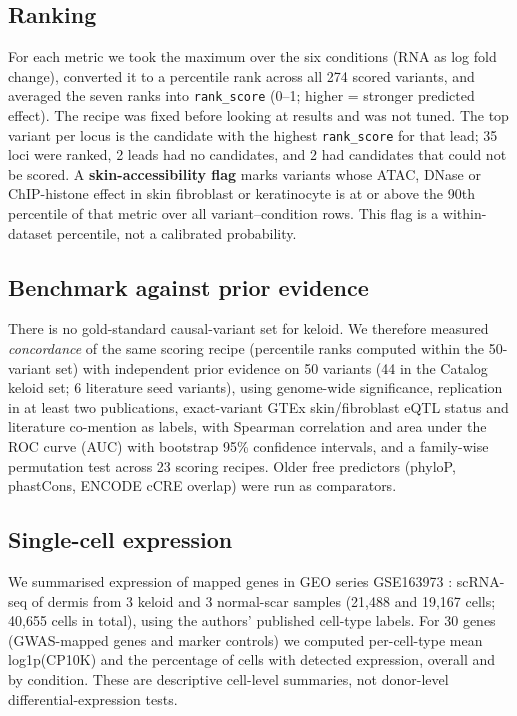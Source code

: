 \documentclass[10pt,twocolumn,a4paper]{article}
\begin{document}
\subsection{Ranking}

For each metric we took the maximum over the six conditions (RNA as \textbar log fold change\textbar), converted it to a percentile rank across all 274 scored variants, and averaged the seven ranks into \texttt{rank\_score} (0--1; higher = stronger predicted effect). The recipe was fixed before looking at results and was not tuned. The top variant per locus is the candidate with the highest \texttt{rank\_score} for that lead; 35 loci were ranked, 2 leads had no candidates, and 2 had candidates that could not be scored. A \textbf{skin-accessibility flag} marks variants whose ATAC, DNase or ChIP-histone effect in skin fibroblast or keratinocyte is at or above the 90th percentile of that metric over all variant--condition rows. This flag is a within-dataset percentile, not a calibrated probability.

\subsection{Benchmark against prior evidence}

There is no gold-standard causal-variant set for keloid. We therefore measured \emph{concordance} of the same scoring recipe (percentile ranks computed within the 50-variant set) with independent prior evidence on 50 variants (44 in the Catalog keloid set; 6 literature seed variants), using genome-wide significance, replication in at least two publications, exact-variant GTEx skin/fibroblast eQTL status and literature co-mention as labels, with Spearman correlation and area under the ROC curve (AUC) with bootstrap 95\% confidence intervals, and a family-wise permutation test across 23 scoring recipes. Older free predictors (phyloP, phastCons, ENCODE cCRE overlap) were run as comparators.

\subsection{Single-cell expression}

We summarised expression of mapped genes in GEO series GSE163973 \cite{k20}: scRNA-seq of dermis from 3 keloid and 3 normal-scar samples (21,488 and 19,167 cells; 40,655 cells in total), using the authors' published cell-type labels. For 30 genes (GWAS-mapped genes and marker controls) we computed per-cell-type mean log1p(CP10K) and the percentage of cells with detected expression, overall and by condition. These are descriptive cell-level summaries, not donor-level differential-expression tests.
\end{document}
